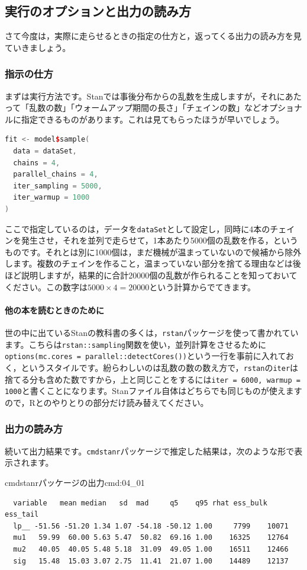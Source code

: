 \documentclass{ltjsbook}
\begin{document}
\subsection{実行のオプションと出力の読み方}
さて今度は，実際に走らせるときの指定の仕方と，返ってくる出力の読み方を見ていきましょう。
\subsubsection{指示の仕方}
まずは実行方法です。Stanでは事後分布からの乱数を生成しますが，それにあたって「乱数の数」「ウォームアップ期間の長さ」「チェインの数」などオプショナルに指定できるものがあります。これは見てもらったほうが早いでしょう。
\begin{lstlisting}[language=C++,label={code:04_03},caption={cmdstanrのスタイル}]
fit <- model$sample(
  data = dataSet,
  chains = 4,
  parallel_chains = 4,
  iter_sampling = 5000,
  iter_warmup = 1000
)
\end{lstlisting}
ここで指定しているのは，データを\verb|dataSet|として設定し，同時に4本のチェインを発生させ，それを並列で走らせて，1本あたり5000個の乱数を作る，というものです。それとは別に1000個は，まだ機械が温まっていないので候補から除外します。複数のチェインを作ること，温まっていない部分を捨てる理由などは後ほど説明しますが，結果的に合計20000個の乱数が作られることを知っておいてください。この数字は$5000\times4 = 20000$という計算からでてきます。

\paragraph{他の本を読むときのために} 世の中に出ているStanの教科書の多くは，\verb|rstan|パッケージを使って書かれています。こちらは\verb|rstan::sampling|関数を使い，並列計算をさせるために\verb|options(mc.cores = parallel::detectCores())|という一行を事前に入れておく，というスタイルです。紛らわしいのは乱数の数の数え方で，\verb|rstan|の\verb|iter|は捨てる分も含めた数ですから，上と同じことをするには\verb|iter = 6000, warmup = 1000|と書くことになります。Stanファイル自体はどちらでも同じものが使えますので，Rとのやりとりの部分だけ読み替えてください。

\subsubsection{出力の読み方}
続いて出力結果です。\verb|cmdstanr|パッケージで推定した結果は，次のような形で表示されます。
\begin{SCcmd}{cmdstanrパッケージの出力}{cmd:04_01}
	\begin{verbatim}
  variable   mean median   sd  mad     q5    q95 rhat ess_bulk ess_tail
  lp__ -51.56 -51.20 1.34 1.07 -54.18 -50.12 1.00     7799    10071
  mu1   59.99  60.00 5.63 5.47  50.82  69.16 1.00    16325    12764
  mu2   40.05  40.05 5.48 5.18  31.09  49.05 1.00    16511    12466
  sig   15.48  15.03 3.07 2.75  11.41  21.07 1.00    14489    12137
\end{verbatim}
\end{SCcmd}
\end{document}
